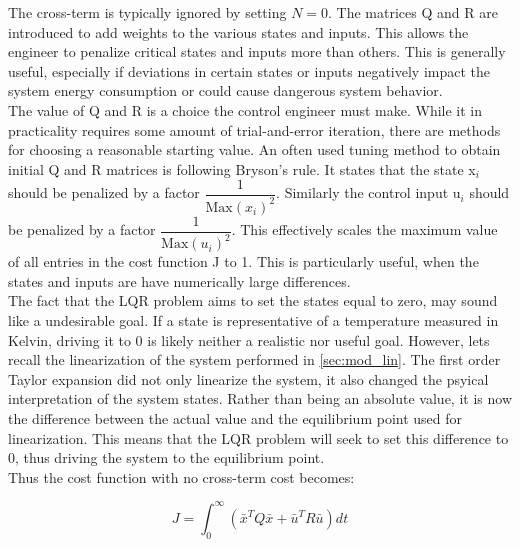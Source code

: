 The cross-term is typically ignored by setting $N=0$. The matrices Q and R are introduced to add weights to the various states and inputs. This allows the engineer to penalize critical states and inputs more than others. This is generally useful, especially if deviations in certain states or inputs negatively impact the system energy consumption or could cause dangerous system behavior.\\

The value of Q and R is a choice the control engineer must make. While it in practicality requires some amount of trial-and-error iteration, there are methods for choosing a reasonable starting value. An often used tuning method to obtain initial Q and R matrices is following Bryson's rule. It states that the state x$_{\textit{i}}$ should be penalized by a factor $\dfrac{1}{\text{Max} \left(x_{\textit{i}}\right)^2}$. Similarly the control input u$_{\textit{i}}$ should be penalized by a factor $\dfrac{1}{\text{Max} \left(u_{\textit{i}}\right)^2}$. This effectively scales the maximum value of all entries in the cost function J to 1. This is particularly useful, when the states and inputs are have numerically large differences.\\


The fact that the LQR problem aims to set the states equal to zero, may sound like a undesirable goal. If a state is representative of a temperature measured in Kelvin, driving it to 0 is likely neither a realistic nor useful goal. However, lets recall the linearization of the system performed in \cref{sec:mod_lin}. The first order Taylor expansion did not only linearize the system, it also changed the psyical interpretation of the system states. Rather than being an absolute value, it is now the difference between the actual value and the equilibrium point used for linearization. This means that the LQR problem will seek to set this difference to 0, thus driving the system to the equilibrium point.\\

Thus the cost function with no cross-term cost becomes:

\begin{equation} \label{eq:lqr_cost_fcn}
	J = \int_0^{\infty} \left( \bar{x}^TQ\bar{x} + \bar{u}^TR\bar{u} \right)dt
\end{equation}

